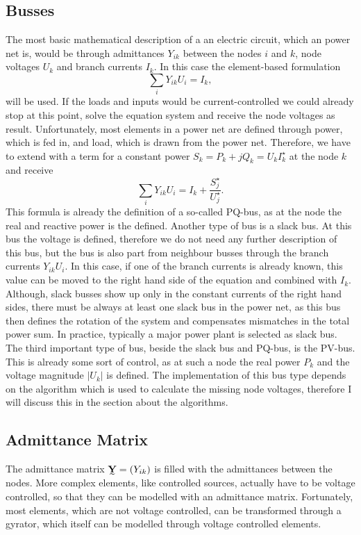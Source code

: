 \subsection{Busses}
The most basic mathematical description of a an electric circuit, which an power net is, would be through admittances $Y_{ik}$ between the nodes $i$ and $k$, node voltages $U_k$ and branch currents $I_k$. In this case the element-based formulation
\begin{equation}
	\sum_i Y_{ik} U_i = I_k,
	\label{eq:current_controlled}
\end{equation}
will be used. If the loads and inputs would be current-controlled we could already stop at this point, solve the equation system and receive the node voltages as result. Unfortunately, most elements in a power net are defined through power, which is fed in, and load, which is drawn from the power net. Therefore, we have to extend  with a term for a constant power $S_k = P_k + j Q_k = U_k I_k^\star$ at the node $k$ and receive
\begin{equation}
	\sum_i Y_{ik} U_i = I_k + \frac{S_j^\star}{U_j^\star}.
	\label{eq:pq_bus}
\end{equation}
This formula is already the definition of a so-called PQ-bus, as at the node the real and reactive power is the defined.
Another type of bus is a slack bus. At this bus the voltage is defined, therefore we do not need any further description of this bus, but the bus is also part from neighbour busses through the branch currents $Y_{ik} U_i$. In this case, if one of the branch currents is already known, this value can be moved to the right hand side of the equation  and combined with $I_k$. Although, slack busses show up only in the constant currents of the right hand sides, there must be always at least one slack bus in the power net, as this bus then defines the rotation of the system and compensates mismatches in the total power sum. In practice, typically a major power plant is selected as slack bus.
The third important type of bus, beside the slack bus and PQ-bus, is the PV-bus. This is already some sort of control, as at such a node the real power $P_k$ and the voltage magnitude $|U_k|$ is defined. The implementation of this bus type depends on the algorithm which is used to calculate the missing node voltages, therefore I will discuss this in the section about the algorithms.

\subsection{Admittance Matrix}
The admittance matrix $\mat Y = (Y_{ik})$ is filled with the admittances between the nodes. More complex elements, like controlled sources, actually have to be voltage controlled, so that they can be modelled with an admittance matrix. Fortunately, most elements, which are not voltage controlled, can be transformed through a gyrator, which itself can be modelled through voltage controlled elements.

